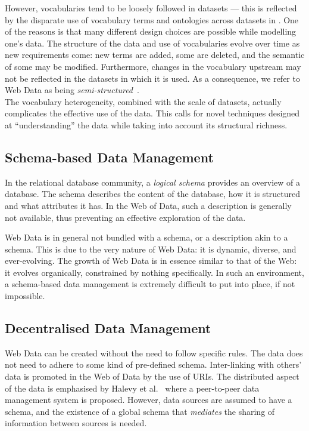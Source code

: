 However, vocabularies tend to be loosely followed in datasets --- this is reflected by the disparate use of vocabulary terms and ontologies across datasets in \cite{campinas:2011:eos}. One of the reasons is that many different design choices are possible while modelling one's data. The structure of the data and use of vocabularies evolve over time as new requirements come: new terms are added, some are deleted, and the semantic of some may be modified. Furthermore, changes in the vocabulary upstream may not be reflected in the datasets in which it is used. As a consequence, we refer to Web Data as being \emph{semi-structured}~\cite{abiteboul:1997:icdt}.\\

The vocabulary heterogeneity, combined with the scale of datasets, actually complicates the effective use of the data. This calls for novel techniques designed at ``understanding'' the data while taking into account its structural richness.

\subsection{Schema-based Data Management}

In the relational database community, a \emph{logical schema} provides an overview of a database. The schema describes the content of the database, how it is structured and what attributes it has. In the Web of Data, such a description is generally not available, thus preventing an effective exploration of the data.

Web Data is in general not bundled with a schema, or a description akin to a schema. This is due to the very nature of Web Data: it is dynamic, diverse, and ever-evolving. The growth of Web Data is in essence similar to that of the Web: it evolves organically, constrained by nothing specifically. In such an environment, a schema-based data management is extremely difficult to put into place, if not impossible.

\subsection{Decentralised Data Management}

Web Data can be created without the need to follow specific rules. The data does not need to adhere to some kind of pre-defined schema. Inter-linking with others' data is promoted in the Web of Data by the use of URIs. The distributed aspect of the data is emphasised by Halevy et al.~\cite{halevy:2003:smp} where a peer-to-peer data management system is proposed. However, data sources are assumed to have a schema, and the existence of a global schema that \emph{mediates} the sharing of information between sources is needed.

